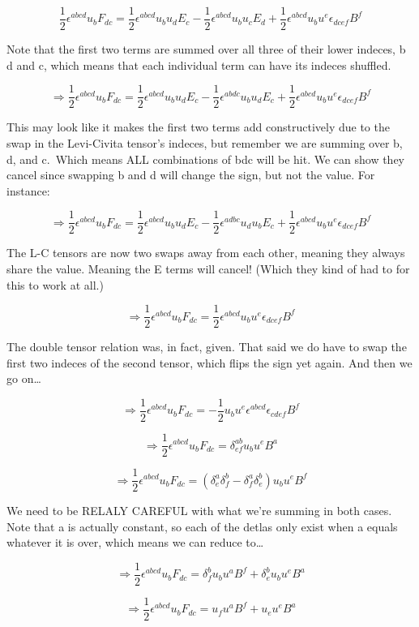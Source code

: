 \documentclass[landscape,letterpaper,10pt,english]{article}
\begin{document}
\[ \frac12 \epsilon^{abcd}u_bF_{dc} = \frac12 \epsilon^{abcd}u_bu_dE_c - \frac12 \epsilon^{abcd}u_bu_cE_d + \frac12 \epsilon^{abcd}u_bu^e\epsilon_{dcef} B^f \]

    Note that the first two terms are summed over all three of their lower
indeces, b d and c, which means that each individual term can have its
indeces shuffled.

\[ \Rightarrow \frac12 \epsilon^{abcd}u_bF_{dc} = \frac12 \epsilon^{abcd}u_bu_dE_c - \frac12 \epsilon^{abdc}u_bu_dE_c + \frac12 \epsilon^{abcd}u_bu^e\epsilon_{dcef} B^f \]

This may look like it makes the first two terms add constructively due
to the swap in the Levi-Civita tensor's indeces, but remember we are
summing over b, d, and c.~Which means ALL combinations of bdc will be
hit. We can show they cancel since swapping b and d will change the
sign, but not the value. For instance:

\[ \Rightarrow \frac12 \epsilon^{abcd}u_bF_{dc} = \frac12 \epsilon^{abcd}u_bu_dE_c - \frac12 \epsilon^{adbc}u_du_bE_c + \frac12 \epsilon^{abcd}u_bu^e\epsilon_{dcef} B^f \]

The L-C tensors are now two swaps away from each other, meaning they
always share the value. Meaning the E terms will cancel! (Which they
kind of had to for this to work at all.)

\[ \Rightarrow \frac12 \epsilon^{abcd}u_bF_{dc} = \frac12 \epsilon^{abcd}u_bu^e\epsilon_{dcef} B^f \]

    The double tensor relation was, in fact, given. That said we do have to
swap the first two indeces of the second tensor, which flips the sign
yet again. And then we go on\ldots{}

\[ \Rightarrow \frac12 \epsilon^{abcd}u_bF_{dc} = -\frac12 u_bu^e\epsilon^{abcd}\epsilon_{cdef} B^f \]

\[ \Rightarrow \frac12 \epsilon^{abcd}u_bF_{dc} = \delta^{ab}_{ef} u_bu^e B^a \]

\[ \Rightarrow \frac12 \epsilon^{abcd}u_bF_{dc} = (\delta^a_e \delta^b_f - \delta^a_f \delta^b_e) u_bu^eB^f \]

We need to be RELALY CAREFUL with what we're summing in both cases. Note
that a is actually constant, so each of the detlas only exist when a
equals whatever it is over, which means we can reduce to\ldots{}

\[ \Rightarrow \frac12 \epsilon^{abcd}u_bF_{dc} =  \delta^b_f u_bu^aB^f + \delta^b_e u_bu^eB^a \]

\[ \Rightarrow \frac12 \epsilon^{abcd}u_bF_{dc} =  u_fu^aB^f + u_eu^eB^a \]
\end{document}
